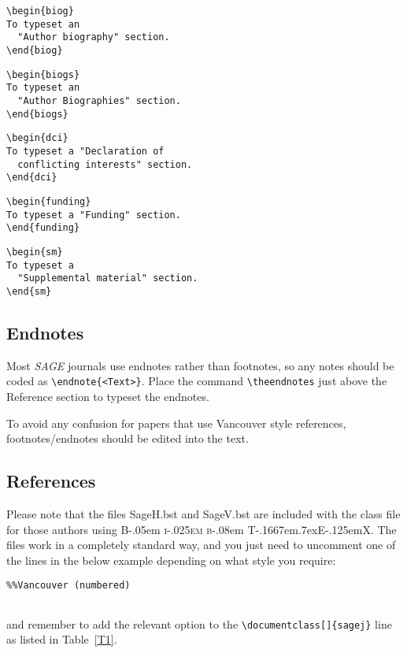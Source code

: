 \documentclass[Afour,sagev,times]{sagej}
\newcommand\BibTeX{{\rmfamily B\kern-.05em \textsc{i\kern-.025em b}\kern-.08em
T\kern-.1667em\lower.7ex\hbox{E}\kern-.125emX}}
\begin{document}
\begin{verbatim}
\begin{biog}
To typeset an
  "Author biography" section.
\end{biog}
\end{verbatim}

\begin{verbatim}
\begin{biogs}
To typeset an
  "Author Biographies" section.
\end{biogs}
\end{verbatim}


\begin{verbatim}
\begin{dci}
To typeset a "Declaration of
  conflicting interests" section.
\end{dci}
\end{verbatim}

\begin{verbatim}
\begin{funding}
To typeset a "Funding" section.
\end{funding}
\end{verbatim}

\begin{verbatim}
\begin{sm}
To typeset a
  "Supplemental material" section.
\end{sm}
\end{verbatim}

\subsection{Endnotes}
Most \textit{SAGE} journals use endnotes rather than footnotes, so any notes should be coded as \verb+\endnote{<Text>}+.
Place the command \verb+\theendnotes+ just above the Reference section to typeset the endnotes.

To avoid any confusion for papers that use Vancouver style references,  footnotes/endnotes should be edited into the text.

\subsection{References}
Please note that the files \textsf{SageH.bst} and \textsf{SageV.bst} are included with the class file
for those authors using \BibTeX.
The files work in a completely standard way, and you just need to uncomment one of the lines in the below example depending on what style you require:
\begin{verbatim}
%%Vancouver (numbered)


\end{verbatim}
and remember to add the relevant option to the \verb+\documentclass[]{sagej}+ line as listed in Table~\ref{T1}.
\end{document}
